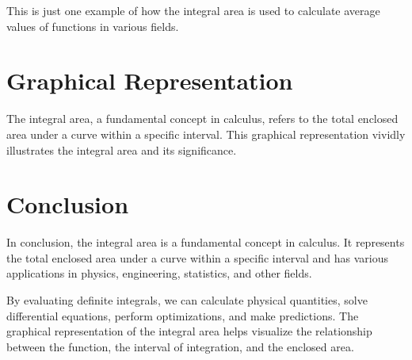 \documentclass{article}
\begin{document}
This is just one example of how the integral area is used to calculate average values of functions in various fields.

\section{Graphical Representation}

The integral area, a fundamental concept in calculus, refers to the total enclosed area under a curve within a specific interval. This graphical representation vividly illustrates the integral area and its significance. 

\begin{center}
\end{center}
\section{Conclusion}

In conclusion, the integral area is a fundamental concept in calculus. It represents the total enclosed area under a curve within a specific interval and has various applications in physics, engineering, statistics, and other fields.

By evaluating definite integrals, we can calculate physical quantities, solve differential equations, perform optimizations, and make predictions. The graphical representation of the integral area helps visualize the relationship between the function, the interval of integration, and the enclosed area.
\end{document}
